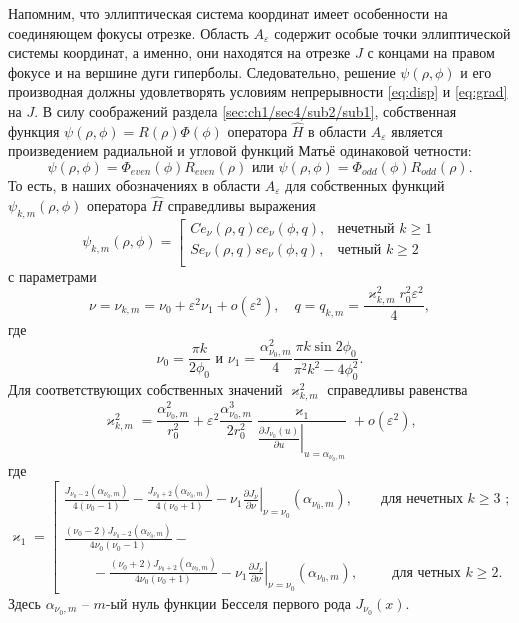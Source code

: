 Напомним, что эллиптическая система координат имеет особенности на соединяющем фокусы отрезке. Область $A_\varepsilon$ содержит особые точки эллиптической системы координат, а именно, они находятся на отрезке $J$ с концами на правом фокусе и на вершине дуги гиперболы.
Следовательно, решение $\psi(\rho, \phi)$ и его производная должны удовлетворять условиям непрерывности \eqref{eq:disp} и \eqref{eq:grad} на  $J$.
В силу соображений раздела \ref{sec:ch1/sec4/sub2/sub1}, собственная функция  $\psi(\rho,\phi)=R(\rho) \Phi(\phi)$ оператора $\hat{H}$ в области $A_\varepsilon$ является произведением радиальной и угловой функций Матьё одинаковой четности:
$$ \psi(\rho,\phi) = \Phi_{even}(\phi) R_{even}(\rho)  
\text{ или }
 \psi(\rho,\phi) = \Phi_{odd}(\phi) R_{odd}(\rho) .  $$
То есть, в наших обозначениях в области $A_\varepsilon$ для собственных функций $\psi_{k, m}(\rho, \phi)$ оператора   $\hat{H}$ справедливы выражения
\begin{equation}
\psi_{k, m}(\rho, \phi) = 
\left[
\begin{array}{ll}
    Ce_\nu(\rho, q) ce_\nu(\phi, q) ,   &    \text{нечетный $k \geq 1$}\\
    Se_\nu(\rho, q) se_\nu(\phi, q) ,   &    \text{четный $k \geq 2$}\\
\end{array}
\right.\label{eq:fun}
\end{equation}
с параметрами
\[
\nu = \nu_{k,m} = \nu_0+ \varepsilon^2 \nu_1 + o(\varepsilon^2),  \quad q=q_{k,m} = \dfrac{\varkappa_{k,m}^2 r_0^2 \varepsilon^2}{4},
\]
где
$$\nu_0 = \frac{\pi k}{2\phi_0}\text{\ \  и\  \  }\nu_1=\frac{\alpha_{\nu_0, m}^2}{4} \frac{\pi k \sin 2\phi_0}{\pi^2 k^2 - 4\phi_0^2}  .$$
Для соответствующих собственных  значений  $\varkappa^2_{k, m}$ справедливы равенства
\begin{equation}
\varkappa^2_{k, m} = \dfrac{\alpha_{\nu_0, m}^2}{r_0^2} +
\varepsilon^2 \dfrac{\alpha_{\nu_0, m}^3}{2 r_0^2}\dfrac{\varkappa_1 }{ \left.\frac{\partial J_{\nu_0}(u)}{\partial u}\right|_{u=\alpha_{\nu_0, m}} } + o(\varepsilon^2),\label{eq:val}
\end{equation}
где
\begin{equation*}
    \varkappa_1 = 
    \left[
\begin{array}{ll}
\frac{J_{\nu_0-2}(\alpha_{\nu_0, m})}{4(\nu_0-1)} - \frac{J_{\nu_0+2}(\alpha_{\nu_0, m})}{4(\nu_0+1)} 
  - \nu_1 \left.\frac{\partial J_\nu}{\partial \nu}\right|_{\nu=\nu_0}(\alpha_{\nu_0, m}),\qquad \text{для нечетных $k\geq 3$ ;} \\[10pt]
\frac{(\nu_0 - 2)J_{\nu_0-2}(\alpha_{\nu_0, m})   }{4\nu_0 (\nu_0-1)} -\\
\qquad - \frac{(\nu_0 + 2)J_{\nu_0+2}(\alpha_{\nu_0, m})}{4\nu_0 (\nu_0+1)}  
- \nu_1 \left.\frac{\partial J_\nu}{\partial \nu}\right|_{\nu = \nu_0}(\alpha_{\nu_0, m}), \qquad \ \ \!    \text{для четных $k \geq 2$}.        
\end{array}
\right.
\end{equation*}
Здесь $\alpha_{\nu_0,m}$ --  $m$-ый нуль функции Бесселя первого рода $J_{\nu_0}(x)$.


